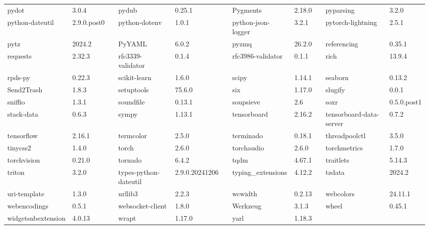 \begin{table}[h]
{\begin{tabular}{llp{1.5cm}llp{1.5cm}llp{1.5cm}ll}
        pydot & 3.0.4 & & pydub & 0.25.1 & & Pygments & 2.18.0 & & pyparsing & 3.2.0 \\
        python-dateutil & 2.9.0.post0 & & python-dotenv & 1.0.1 & & python-json-logger & 3.2.1 & & pytorch-lightning & 2.5.1 \\
        pytz & 2024.2 & & PyYAML & 6.0.2 & & pyzmq & 26.2.0 & & referencing & 0.35.1 \\
        requests & 2.32.3 & & rfc3339-validator & 0.1.4 & & rfc3986-validator & 0.1.1 & & rich & 13.9.4 \\
        rpds-py & 0.22.3 & & scikit-learn & 1.6.0 & & scipy & 1.14.1 & & seaborn & 0.13.2 \\
        Send2Trash & 1.8.3 & & setuptools & 75.6.0 & & six & 1.17.0 & & slugify & 0.0.1 \\
        sniffio & 1.3.1 & & soundfile & 0.13.1 & & soupsieve & 2.6 & & soxr & 0.5.0.post1 \\
        stack-data & 0.6.3 & & sympy & 1.13.1 & & tensorboard & 2.16.2 & & tensorboard-data-server & 0.7.2 \\
        tensorflow & 2.16.1 & & termcolor & 2.5.0 & & terminado & 0.18.1 & & threadpoolctl & 3.5.0 \\
        tinycss2 & 1.4.0 & & torch & 2.6.0 & & torchaudio & 2.6.0 & & torchmetrics & 1.7.0 \\
        torchvision & 0.21.0 & & tornado & 6.4.2 & & tqdm & 4.67.1 & & traitlets & 5.14.3 \\
        triton & 3.2.0 & & types-python-dateutil & 2.9.0.20241206 & & typing\_extensions & 4.12.2 & & tzdata & 2024.2 \\
        uri-template & 1.3.0 & & urllib3 & 2.2.3 & & wcwidth & 0.2.13 & & webcolors & 24.11.1 \\
        webencodings & 0.5.1 & & websocket-client & 1.8.0 & & Werkzeug & 3.1.3 & & wheel & 0.45.1 \\
        widgetsnbextension & 4.0.13 & & wrapt & 1.17.0 & & yarl & 1.18.3 & &  &  \\
        \bottomrule
    \end{tabular}
    }
    \label{apendice-a:paquetes}
\end{table}
